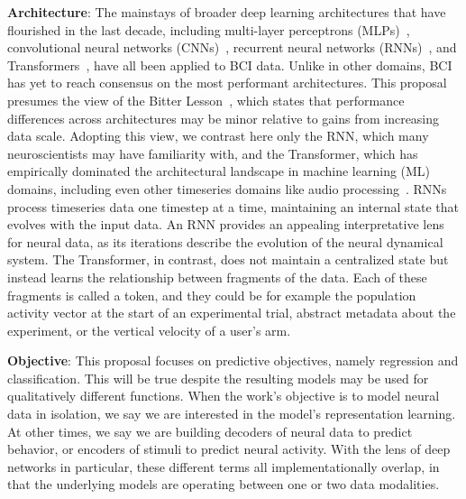 \documentclass[12pt,oneside]{report}
\begin{document}
\textbf{Architecture}: The mainstays of broader deep learning architectures that have flourished in the last decade, including multi-layer perceptrons (MLPs)~\citep{Willsey2022HighVelocity}, convolutional neural networks (CNNs)~\citep{temmar2024artificial}, recurrent neural networks (RNNs)~\citep{pandarinath_18_lfads}, and Transformers~\citep{ye_21_ndt}, have all been applied to BCI data. Unlike in other domains, BCI has yet to reach consensus on the most performant architectures. This proposal presumes the view of the Bitter Lesson~\citep{sutton2019}, which states that performance differences across architectures may be minor relative to gains from increasing data scale. Adopting this view, we contrast here only the RNN, which many neuroscientists may have familiarity with, and the Transformer, which has empirically dominated the architectural landscape in machine learning (ML) domains, including even other timeseries domains like audio processing~\citep{radford2022whisper}. RNNs process timeseries data one timestep at a time, maintaining an internal state that evolves with the input data. An RNN provides an appealing interpretative lens for neural data, as its iterations describe the evolution of the neural dynamical system. The Transformer, in contrast, does not maintain a centralized state but instead learns the relationship between fragments of the data. Each of these fragments is called a token, and they could be for example the population activity vector at the start of an experimental trial, abstract metadata about the experiment, or the vertical velocity of a user’s arm.

\textbf{Objective}: This proposal focuses on predictive objectives, namely regression and classification. This will be true despite the resulting models may be used for qualitatively different functions. When the work’s objective is to model neural data in isolation, we say we are interested in the model’s representation learning. At other times, we say we are building decoders of neural data to predict behavior, or encoders of stimuli to predict neural activity. With the lens of deep networks in particular, these different terms all implementationally overlap, in that the underlying models are operating between one or two data modalities.
\end{document}
